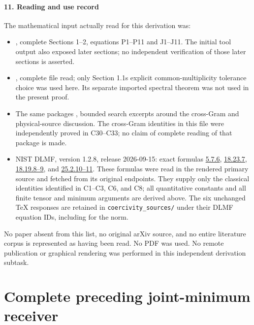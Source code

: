 \subsection{11. Reading and use record}\label{mrcoerc:reading-and-use-record}

The mathematical input actually read for this derivation was:

\begin{itemize}
\mrcoerctightlist
\item
  , complete Sections 1--2, equations P1--P11 and J1--J11. The initial tool output also exposed later sections; no independent verification of those later sections is asserted.
\item
  , complete file read; only Section 1.1\textquotesingle s explicit common-multiplicity tolerance choice was used here. Its separate imported spectral theorem was not used in the present proof.
\item
  The same package\textquotesingle s , bounded search excerpts around the cross-Gram and physical-source discussion. The cross-Gram identities in this file were independently proved in C30--C33; no claim of complete reading of that package is made.
\item
  NIST DLMF, version 1.2.8, release 2026-09-15: exact formulas \href{https://dlmf.nist.gov/5.7.E6}{5.7.6}, \href{https://dlmf.nist.gov/18.23.E7}{18.23.7}, \href{https://dlmf.nist.gov/18.19.E8}{18.19.8--9}, and \href{https://dlmf.nist.gov/25.2.E10}{25.2.10--11}. These formulas were read in the rendered primary source and fetched from its original  endpoints. They supply only the classical identities identified in C1--C3, C6, and C8; all quantitative constants and all finite tensor and minimum arguments are derived above. The six unchanged TeX responses are retained in \texttt{coercivity\_sources/} under their DLMF equation IDs, including  for the norm.
\end{itemize}

No paper absent from this list, no original arXiv source, and no entire literature corpus is represented as having been read. No PDF was used. No remote publication or graphical rendering was performed in this independent derivation subtask.

\endgroup

\clearpage\begingroup
\part*{Complete preceding joint-minimum receiver}
\newcommand{\mrjmC}{\mathbb C}

